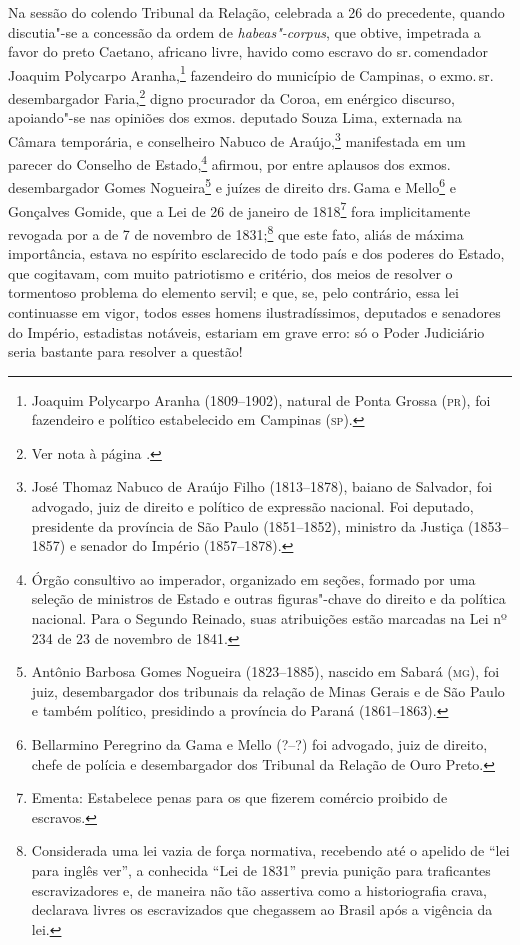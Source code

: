 Na sessão do colendo Tribunal da Relação, celebrada a 26 do precedente,
quando discutia"-se a concessão da ordem de \emph{habeas"-corpus}, que
obtive, impetrada a favor do preto Caetano, africano livre, havido como
escravo do sr.\,comendador Joaquim Polycarpo Aranha,\footnote{Joaquim
  Polycarpo Aranha (1809--1902), natural de Ponta Grossa (\textsc{pr}), foi
  fazendeiro e político estabelecido em Campinas (\textsc{sp}).} fazendeiro do
município de Campinas, o exmo.\,sr.\,desembargador Faria,\footnote{Ver nota à página \pageref{jff}.} digno procurador da Coroa, em enérgico discurso,
apoiando"-se nas opiniões dos exmos. deputado Souza Lima, externada na
Câmara temporária, e conselheiro Nabuco de Araújo,\footnote{José
  Thomaz Nabuco de Araújo Filho (1813--1878), baiano de Salvador, foi
  advogado, juiz de direito e político de expressão nacional. Foi
  deputado, presidente da província de São Paulo (1851--1852), ministro
  da Justiça (1853--1857) e senador do Império (1857--1878).} manifestada
em um parecer do Conselho de Estado,\footnote{Órgão consultivo ao
  imperador, organizado em seções, formado por uma seleção de ministros
  de Estado e outras figuras"-chave do direito e da política nacional.
  Para o Segundo Reinado, suas atribuições estão marcadas na Lei nº 234
  de 23 de novembro de 1841.} afirmou, por entre aplausos dos exmos.
desembargador Gomes Nogueira\footnote{Antônio Barbosa Gomes Nogueira
  (1823--1885), nascido em Sabará (\textsc{mg}), foi juiz, desembargador dos
  tribunais da relação de Minas Gerais e de São Paulo e também
  político, presidindo a província do Paraná (1861--1863).} e juízes de
direito drs.\,Gama e Mello\footnote{Bellarmino Peregrino da Gama e
  Mello (?--?) foi advogado, juiz de direito, chefe de polícia e
  desembargador dos Tribunal da Relação de Ouro Preto.} e Gonçalves
Gomide, que a Lei de 26 de janeiro de 1818\footnote{Ementa: Estabelece
  penas para os que fizerem comércio proibido de escravos.} fora
implicitamente revogada por a de 7 de novembro de 1831;\footnote{
  Considerada uma lei vazia de força normativa, recebendo até o apelido
  de ``lei para inglês ver'', a conhecida ``Lei de 1831'' previa punição
  para traficantes escravizadores e, de maneira não tão assertiva como a
  historiografia crava, declarava livres os escravizados que chegassem
  ao Brasil após a vigência da lei.} que este fato, aliás de máxima
importância, estava no espírito esclarecido de todo país e dos poderes
do Estado, que cogitavam, com muito patriotismo e critério, dos meios de
resolver o tormentoso problema do elemento servil; e que, se, pelo
contrário, essa lei continuasse em vigor, todos esses homens
ilustradíssimos, deputados e senadores do Império, estadistas notáveis,
estariam em grave erro: só o Poder Judiciário seria bastante para
resolver a questão!

